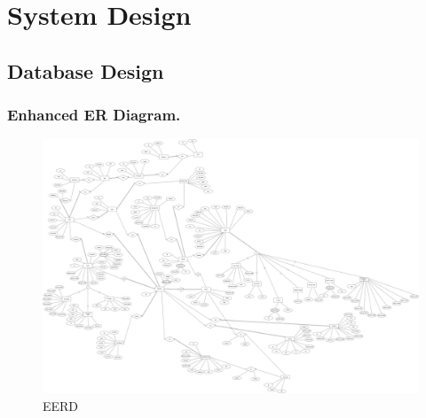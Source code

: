\chapter{System Design}
\newpage
\section{Database Design}
\subsection{Enhanced ER Diagram.}
\begin{figure}[H]
    \centering
    \includegraphics[width=\textwidth, height=\textheight, keepaspectratio]{graphics/DB/freight-flex-ERD.drawio.png}
    \caption{EERD}
    \label{fig:EERD}
\end{figure}

